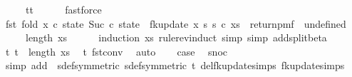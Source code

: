 \begin{isabellebody}
\ \ \ \ {\isacharequal}{\kern0pt}\ {\isacharparenleft}{\kern0pt}t{}{\isacharcomma}{\kern0pt}t{}{\isacharparenright}{\kern0pt}{\isachardoublequoteclose}\isanewline
\ \ \ \ \isamarkupfalse%
\ fastforce\isanewline
\isanewline
\ \ \isamarkupfalse%
\ {\isachardoublequoteopen}fst\ {\isacharparenleft}{\kern0pt}fold\ {\isacharparenleft}{\kern0pt}{\isasymlambda}x\ {\isacharparenleft}{\kern0pt}c{\isacharcomma}{\kern0pt}\ state{\isacharparenright}{\kern0pt}{\isachardot}{\kern0pt}\ {\isacharparenleft}{\kern0pt}Suc\ c{\isacharcomma}{\kern0pt}\ state\ {\isasymbind}\ fk{\isacharunderscore}{\kern0pt}update{\isacharprime}{\kern0pt}\ x\ s\ s\ c{\isacharparenright}{\kern0pt}{\isacharparenright}{\kern0pt}\ xs\ {\isacharparenleft}{\kern0pt}{}{\isacharcomma}{\kern0pt}\ return{\isacharunderscore}{\kern0pt}pmf\ {\isacharparenleft}{\kern0pt}{\isasymlambda}{\isacharunderscore}{\kern0pt}{\isachardot}{\kern0pt}\ undefined{\isacharparenright}{\kern0pt}{\isacharparenright}{\kern0pt}{\isacharparenright}{\kern0pt}\isanewline
\ \ \ \ {\isacharequal}{\kern0pt}\ length\ xs{\isachardoublequoteclose}\isanewline
\ \ \ \ \isamarkupfalse%
\ {\isacharparenleft}{\kern0pt}induction\ xs\ rule{\isacharcolon}{\kern0pt}rev{\isacharunderscore}{\kern0pt}induct{\isacharcomma}{\kern0pt}\ simp{\isacharcomma}{\kern0pt}\ simp\ add{\isacharcolon}{\kern0pt}split{\isacharunderscore}{\kern0pt}beta{\isacharparenright}{\kern0pt}\ \isanewline
\ \ \isamarkupfalse%
\ t{}{\isacharcolon}{\kern0pt}\ {\isachardoublequoteopen}t{}\ {\isacharequal}{\kern0pt}\ length\ xs{\isachardoublequoteclose}\ \isamarkupfalse%
\ t\ fst{\isacharunderscore}{\kern0pt}conv\ \isamarkupfalse%
\ auto\isanewline
\isanewline
\ \ \isamarkupfalse%
\ {\isacharquery}{\kern0pt}case\ \isamarkupfalse%
\ snoc\isanewline
\ \ \ \ \isamarkupfalse%
\ {\isacharparenleft}{\kern0pt}simp\ add{\isacharcolon}{\kern0pt}\ \ sdef{\isacharbrackleft}{\kern0pt}symmetric{\isacharbrackright}{\kern0pt}\ sdef{\isacharbrackleft}{\kern0pt}symmetric{\isacharbrackright}{\kern0pt}\ t\ del{\isacharcolon}{\kern0pt}fk{\isacharunderscore}{\kern0pt}update{\isacharprime}{\kern0pt}{\isachardot}{\kern0pt}simps\ fk{\isacharunderscore}{\kern0pt}update{\isachardot}{\kern0pt}simps{\isacharparenright}{\kern0pt}\isanewline

\end{isabellebody}

